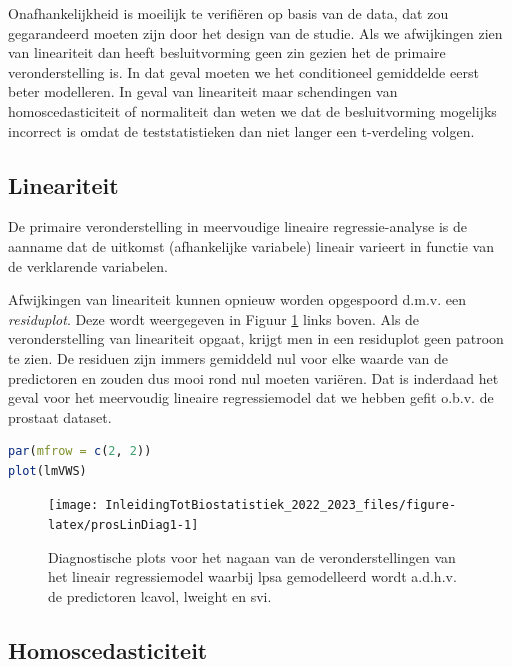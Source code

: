 \documentclass[
  12pt,dutch,coursenotes]{book}
\begin{document}
Onafhankelijkheid is moeilijk te verifiëren op basis van de data, dat zou gegarandeerd moeten zijn door het design van de studie.
Als we afwijkingen zien van lineariteit dan heeft besluitvorming geen zin gezien het de primaire veronderstelling is.
In dat geval moeten we het conditioneel gemiddelde eerst beter modelleren.
In geval van lineariteit maar schendingen van homoscedasticiteit of normaliteit dan weten we dat de besluitvorming mogelijks incorrect is omdat de teststatistieken dan niet langer een t-verdeling volgen.

\hypertarget{lineariteit-1}{%
\subsection{Lineariteit}\label{lineariteit-1}}

De primaire veronderstelling in meervoudige lineaire regressie-analyse is de aanname dat de uitkomst (afhankelijke variabele) lineair varieert in functie van de verklarende variabelen.

Afwijkingen van lineariteit kunnen opnieuw worden opgespoord d.m.v. een \emph{residuplot}. Deze wordt weergegeven in Figuur \ref{fig:prosLinDiag1} links boven. Als de veronderstelling van lineariteit opgaat, krijgt men in een residuplot geen patroon te zien.
De residuen zijn immers gemiddeld nul voor elke waarde van de predictoren en zouden dus mooi rond nul moeten variëren.
Dat is inderdaad het geval voor het meervoudig lineaire regressiemodel dat we hebben gefit o.b.v. de prostaat dataset.

\begin{lstlisting}[language=R]
par(mfrow = c(2, 2))
plot(lmVWS)
\end{lstlisting}

\begin{figure}

{\centering \texttt{[image: InleidingTotBiostatistiek\_2022\_2023\_files/figure-latex/prosLinDiag1-1]} 

}

\caption{Diagnostische plots voor het nagaan van de veronderstellingen van het lineair regressiemodel waarbij lpsa gemodelleerd wordt a.d.h.v. de predictoren lcavol, lweight en svi.}\label{fig:prosLinDiag1}
\end{figure}

\hypertarget{homoscedasticiteit}{%
\subsection{Homoscedasticiteit}\label{homoscedasticiteit}}
\end{document}
